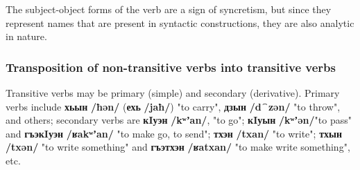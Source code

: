 \documentclass[a4paper,12pt]{book}
\newcommand{\1}[1]{\textbf{\emph{#1}}} %
\newcommand{\2}[1]{\textbf{[#1]}} %
\newcommand{\3}[1]{\fontsize{11pt}{0cm}\textbf{\emph{#1}}} %
\newcommand{\4}[1]{\fontsize{10pt}{0cm}\emph{#1}}	%
\newcommand{\5}[1]{\textbf{/#1/}} %
\newcommand{\6}[1]{\textbf{[#1]}} %
\newcommand{\7}[1]{\fontsize{12pt}{0cm}\emph{#1}} %
\newcommand{\8}[1]{\fontsize{12pt}{0cm}`#1'} %
\newcommand{\9}[1]{\fontsize{12pt}{0cm}(lit. `#1')} %
\newcommand{\glossphonemics}[1]{\textbf{/#1/}} %
\begin{document}
The subject-object forms of the verb are a sign of syncretism, but since they represent names that are present in syntactic constructions, they are also analytic in nature.
\subsubsection{Transposition of non-transitive verbs into transitive verbs}
Transitive verbs may be primary (simple) and secondary (derivative). Primary verbs include \textbf{хьын} \glossphonemics{ħən} (\textbf{ехь} \glossphonemics{jaħ}) "to carry", \textbf{дзын} \glossphonemics{d⁀zən} "to throw", and others; secondary verbs are \textbf{кIуэн} \glossphonemics{kʷʼan}, "to go"; \textbf{кIуын} \glossphonemics{kʷʼən}"to pass" and \textbf{гъэкIуэн} \glossphonemics{ʁakʷʼan} "to make go, to send"; \textbf{тхэн} \glossphonemics{txan} "to write"; \textbf{тхын} \glossphonemics{txən} "to write something" and \textbf{гъэтхэн} \glossphonemics{ʁatxan} "to make write something", etc.
\end{document}
